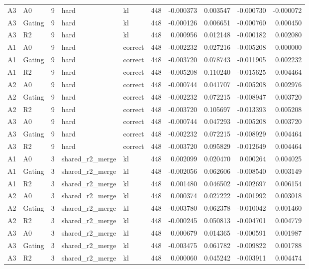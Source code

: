 \begin{tabular}{llrllrrrrr}
A3 & A0 & 9 & hard & kl & 448 & -0.000373 & 0.003547 & -0.000730 & -0.000072 \\
A3 & Gating & 9 & hard & kl & 448 & -0.000126 & 0.006651 & -0.000760 & 0.000450 \\
A3 & R2 & 9 & hard & kl & 448 & 0.000956 & 0.012148 & -0.000182 & 0.002080 \\
A1 & A0 & 9 & hard & correct & 448 & -0.002232 & 0.027216 & -0.005208 & 0.000000 \\
A1 & Gating & 9 & hard & correct & 448 & -0.003720 & 0.078743 & -0.011905 & 0.002232 \\
A1 & R2 & 9 & hard & correct & 448 & -0.005208 & 0.110240 & -0.015625 & 0.004464 \\
A2 & A0 & 9 & hard & correct & 448 & -0.000744 & 0.041707 & -0.005208 & 0.002976 \\
A2 & Gating & 9 & hard & correct & 448 & -0.002232 & 0.072215 & -0.008947 & 0.003720 \\
A2 & R2 & 9 & hard & correct & 448 & -0.003720 & 0.105697 & -0.013393 & 0.005208 \\
A3 & A0 & 9 & hard & correct & 448 & -0.000744 & 0.047293 & -0.005208 & 0.003720 \\
A3 & Gating & 9 & hard & correct & 448 & -0.002232 & 0.072215 & -0.008929 & 0.004464 \\
A3 & R2 & 9 & hard & correct & 448 & -0.003720 & 0.095829 & -0.012649 & 0.004464 \\
A1 & A0 & 3 & shared_r2_merge & kl & 448 & 0.002099 & 0.020470 & 0.000264 & 0.004025 \\
A1 & Gating & 3 & shared_r2_merge & kl & 448 & -0.002056 & 0.062606 & -0.008540 & 0.003149 \\
A1 & R2 & 3 & shared_r2_merge & kl & 448 & 0.001480 & 0.046502 & -0.002697 & 0.006154 \\
A2 & A0 & 3 & shared_r2_merge & kl & 448 & 0.000374 & 0.027222 & -0.001992 & 0.003018 \\
A2 & Gating & 3 & shared_r2_merge & kl & 448 & -0.003780 & 0.062378 & -0.010042 & 0.001460 \\
A2 & R2 & 3 & shared_r2_merge & kl & 448 & -0.000245 & 0.050813 & -0.004701 & 0.004779 \\
A3 & A0 & 3 & shared_r2_merge & kl & 448 & 0.000679 & 0.014365 & -0.000591 & 0.001987 \\
A3 & Gating & 3 & shared_r2_merge & kl & 448 & -0.003475 & 0.061782 & -0.009822 & 0.001788 \\
A3 & R2 & 3 & shared_r2_merge & kl & 448 & 0.000060 & 0.045242 & -0.003911 & 0.004474 \\

\end{tabular}
